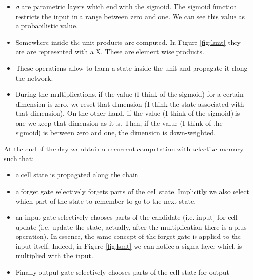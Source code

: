 \begin{itemize}
    \item $\sigma$ are parametric layers which end with the sigmoid. The sigmoid function restricts the input in a range between zero and one. We can see this value as a probabilistic value.
    
    \item Somewhere inside the unit products are computed. In Figure \ref{fig:lsmt} they are are represented with a X. These are element wise products.
    
    \item These operations allow to learn a state inside the unit and propagate it along the network.
    
    \item During the multiplications, if the value (I think of the sigmoid) for a certain dimension is zero, we reset that dimension (I think the state associated with that dimension). On the other hand, if the value (I think of the sigmoid) is one we keep that dimension as it is. Then, if the value (I think of the sigmoid) is between zero and one, the dimension is down-weighted.
\end{itemize}

At the end of the day we obtain a recurrent computation with selective memory such that:
\begin{itemize}
    \item a cell state is propagated along the chain
    
    \item a forget gate selectively forgets parts of the cell state. Implicitly we also select which part of the state to remember to go to the next state.
    
    \item an input gate selectively chooses parts of the candidate (i.e. input) for cell update (i.e. update the state, actually, after the multiplication there is a plus operation). In essence, the same concept of the forget gate is applied to the input itself. Indeed, in Figure \ref{fig:lsmt} we can notice a sigma layer which is multiplied with the input. 
    
    \item Finally output gate selectively chooses parts of the cell state for output
\end{itemize}

